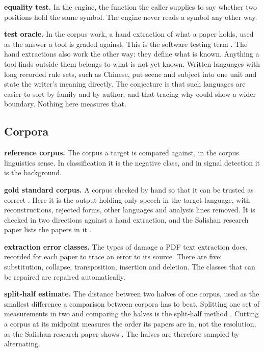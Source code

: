 \noindent\textbf{equality test.} In the engine, the function the caller supplies to say whether two positions hold the same symbol. The engine never reads a symbol any other way.

\noindent\textbf{test oracle.} In the corpus work, a hand extraction of what a paper holds, used as the answer a tool is graded against. This is the software testing term \cite{src:Howden-1978}. The hand extractions also work the other way: they define what is known. Anything a tool finds outside them belongs to what is not yet known. Written languages with long recorded rule sets, such as Chinese, put scene and subject into one unit and state the writer's meaning directly. The conjecture is that such languages are easier to sort by family and by author, and that tracing why could show a wider boundary. Nothing here measures that.

\subsection{Corpora}

\noindent\textbf{reference corpus.} The corpus a target is compared against, in the corpus linguistics sense. In classification it is the negative class, and in signal detection it is the background.

\noindent\textbf{gold standard corpus.} A corpus checked by hand so that it can be trusted as correct \cite{src:Wissler-2014}. Here it is the output holding only speech in the target language, with reconstructions, rejected forms, other languages and analysis lines removed. It is checked in two directions against a hand extraction, and the Salishan research paper lists the papers in it \cite{src:Quigg-Salishan}.

\noindent\textbf{extraction error classes.} The types of damage a PDF text extraction does, recorded for each paper to trace an error to its source. There are five: substitution, collapse, transposition, insertion and deletion. The classes that can be repaired are repaired automatically.

\noindent\textbf{split-half estimate.} The distance between two halves of one corpus, used as the smallest difference a comparison between corpora has to beat. Splitting one set of measurements in two and comparing the halves is the split-half method \cite{src:Spearman-1910, src:Brown-1910}. Cutting a corpus at its midpoint measures the order its papers are in, not the resolution, as the Salishan research paper shows \cite{src:Quigg-Salishan}. The halves are therefore sampled by alternating.

